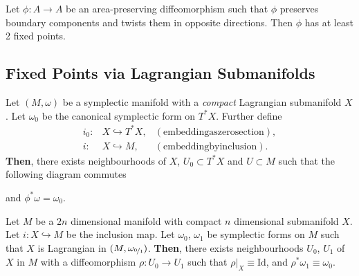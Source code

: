 \documentclass[11pt, final]{article}
\begin{document}
\begin{theorem}
	Let $\phi: A \to A$ be an area-preserving diffeomorphism such that $\phi$ preserves boundary components and twists them in opposite directions. Then $\phi$ has at least 2 fixed points.
\end{theorem}

\subsection{Fixed Points via Lagrangian Submanifolds}

\begin{theorem}\label{thm:Weinstein1}
	Let $(M, \omega)$ be a symplectic manifold with a \textit{compact} Lagrangian submanifold $X$. Let $\omega_0$ be the canonical symplectic form on $T^*X$. Further define
		\begin{subequations}\begin{align}
			i_0: &X \hookrightarrow T^*X,  &\mathrm{(embedding as zero section)},\\
			i: &X \hookrightarrow M,  &\mathrm{(embedding by inclusion)}.
		\end{align}\end{subequations}
	\textbf{Then}, there exists neighbourhoods of $X$, $U_0 \subset T^*X$ and $U \subset M$ such that the following diagram commutes
		\begin{center}
			
		\end{center}
	and $\phi^* \omega = \omega_0$.
\end{theorem}

\begin{theorem}[{[Weinstein 2]}]\label{thm:Weinstein2}
	Let $M$ be a $2n$ dimensional manifold with compact $n$ dimensional submanifold $X$. Let $i: X \hookrightarrow M$ be the inclusion map. Let $\omega_0$, $\omega_1$ be symplectic forms on $M$ such that $X$ is Lagrangian in $(M,\omega_{\nicefrac{0}{1}})$. \textbf{Then}, there exists neighbourhoods $U_0$, $U_1$ of $X$ in $M$ with a diffeomorphism $\rho: U_0 \to U_1$ such that $\rho|_X \equiv \mathrm{Id}$, and $\rho^* \omega_1 \equiv \omega_0$.
\end{theorem}
\end{document}
